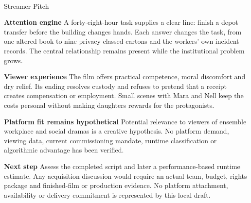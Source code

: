 \documentclass[11pt,letterpaper]{article}
\begin{document}
\begin{center}
{\Large\bfseries\sffamily \filmtitleupper}\\[6pt]
Streamer Pitch
\end{center}
\textbf{Attention engine} A forty-eight-hour task supplies a clear line: finish a depot transfer before the building changes hands. Each answer changes the task, from one altered book to nine privacy-classed cartons and the workers' own incident records. The central relationship remains present while the institutional problem grows.

\textbf{Viewer experience} The film offers practical competence, moral discomfort and dry relief. Its ending resolves custody and refuses to pretend that a receipt creates compensation or employment. Small scenes with Mara and Nell keep the costs personal without making daughters rewards for the protagonists.

\textbf{Platform fit remains hypothetical} Potential relevance to viewers of ensemble workplace and social dramas is a creative hypothesis. No platform demand, viewing data, current commissioning mandate, runtime classification or algorithmic advantage has been verified.

\textbf{Next step} Assess the completed script and later a performance-based runtime estimate. Any acquisition discussion would require an actual team, budget, rights package and finished-film or production evidence. No platform attachment, availability or delivery commitment is represented by this local draft.
\end{document}

